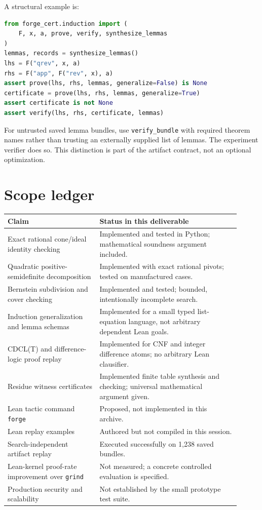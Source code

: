 \documentclass[11pt,letterpaper]{article}
\newcommand{\code}[1]{\texttt{#1}}
\theoremstyle{definition}\newtheorem{definition}[theorem]{Definition}
\theoremstyle{remark}\newtheorem{remark}[theorem]{Remark}
\begin{document}
A structural example is:
\par\noindent
\begin{minipage}{\linewidth}
\begin{lstlisting}[language=Python]
from forge_cert.induction import (
    F, x, a, prove, verify, synthesize_lemmas
)
lemmas, records = synthesize_lemmas()
lhs = F("qrev", x, a)
rhs = F("app", F("rev", x), a)
assert prove(lhs, rhs, lemmas, generalize=False) is None
certificate = prove(lhs, rhs, lemmas, generalize=True)
assert certificate is not None
assert verify(lhs, rhs, certificate, lemmas)
\end{lstlisting}
\end{minipage}\par

For untrusted saved lemma bundles, use \code{verify\_bundle} with required theorem names rather than trusting an externally supplied list of lemmas. The experiment verifier does so. This distinction is part of the artifact contract, not an optional optimization.

\section{Scope ledger}
\begin{longtable}{P{0.36\linewidth}P{0.55\linewidth}}
\toprule
Claim & Status in this deliverable \\
\midrule\endhead
Exact rational cone/ideal identity checking & Implemented and tested in Python; mathematical soundness argument included. \\
Quadratic positive-semidefinite decomposition & Implemented with exact rational pivots; tested on manufactured cases. \\
Bernstein subdivision and cover checking & Implemented and tested; bounded, intentionally incomplete search. \\
Induction generalization and lemma schemas & Implemented for a small typed list-equation language, not arbitrary dependent Lean goals. \\
CDCL(T) and difference-logic proof replay & Implemented for CNF and integer difference atoms; no arbitrary Lean clausifier. \\
Residue witness certificates & Implemented finite table synthesis and checking; universal mathematical argument given. \\
Lean tactic command \code{forge} & Proposed, not implemented in this archive. \\
Lean replay examples & Authored but not compiled in this session. \\
Search-independent artifact replay & Executed successfully on 1,238 saved bundles. \\
Lean-kernel proof-rate improvement over \code{grind} & Not measured; a concrete controlled evaluation is specified. \\
Production security and scalability & Not established by the small prototype test suite. \\
\bottomrule
\end{longtable}
\end{document}
